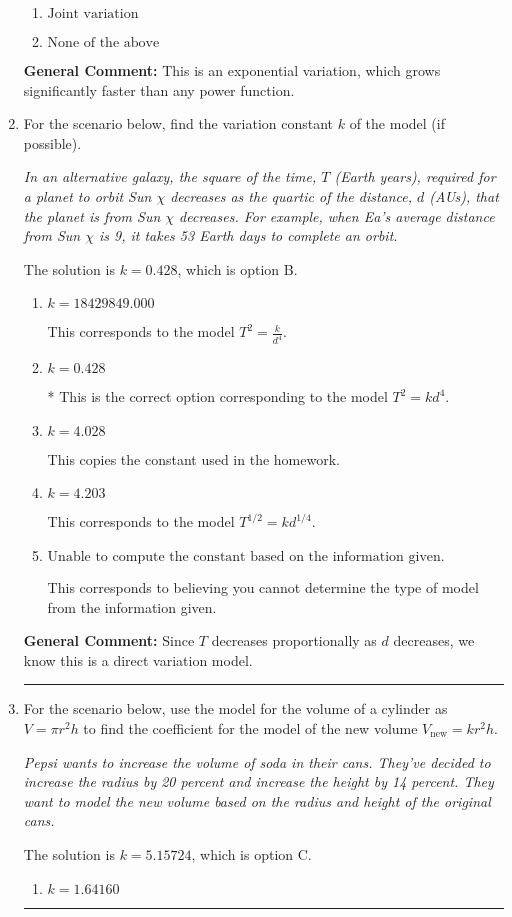 \documentclass{extbook}[14pt]
\newcommand{\litem}[1]{\item #1

\rule{\textwidth}{0.4pt}}
\begin{document}
\begin{enumerate}
{\begin{enumerate}[label=\Alph*.]
\item \( \text{Joint variation} \)


\item \( \text{None of the above} \)


\end{enumerate}

\textbf{General Comment:} This is an exponential variation, which grows significantly faster than any power function.
}
\litem{
For the scenario below, find the variation constant $k$ of the model (if possible).

\begin{center}
    \textit{ In an alternative galaxy, the square of the time, $T$ (Earth years), required for a planet to orbit Sun $\chi$ decreases as the quartic of the distance, $d$ (AUs), that the planet is from Sun $\chi$ decreases. For example, when Ea's average distance from Sun $\chi$ is 9, it takes 53 Earth days to complete an orbit. }
\end{center}
The solution is \( k = 0.428 \), which is option B.\begin{enumerate}[label=\Alph*.]
\item \( k = 18429849.000 \)

This corresponds to the model $T^{2} = \frac{k}{d^{4}}$.
\item \( k = 0.428 \)

* This is the correct option corresponding to the model $T^{2} = k d^{4}$.
\item \( k = 4.028 \)

This copies the constant used in the homework.
\item \( k = 4.203 \)

This corresponds to the model $T^{1/2} = k d^{1/4}$.
\item \( \text{Unable to compute the constant based on the information given.} \)

This corresponds to believing you cannot determine the type of model from the information given.
\end{enumerate}

\textbf{General Comment:} Since $T$ decreases proportionally as $d$ decreases, we know this is a direct variation model.
}
\litem{
For the scenario below, use the model for the volume of a cylinder as $V = \pi r^2 h$ to find the coefficient for the model of the new volume $V_{\text{new}} = k r^2 h$.

\begin{center}
    \textit{ Pepsi wants to increase the volume of soda in their cans. They've decided to increase the radius by 20 percent and increase the height by 14 percent. They want to model the new volume based on the radius and height of the original cans. }
\end{center}
The solution is \( k = 5.15724 \), which is option C.\begin{enumerate}[label=\Alph*.]
\item \( k = 1.64160 \)


\end{enumerate}}
\end{enumerate}
\end{document}
